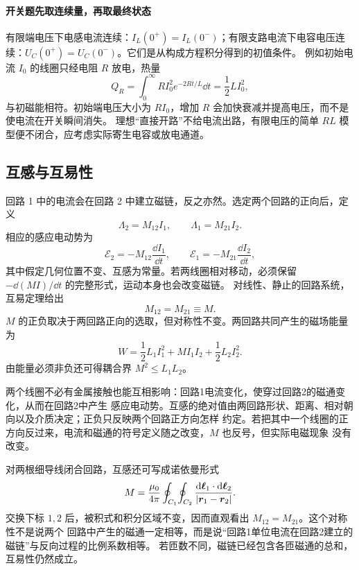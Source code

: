 {%
\paragraph{开关题先取连续量，再取最终状态}
有限端电压下电感电流连续：$I_L(0^+)=I_L(0^-)$；有限支路电流下电容电压连续：$U_C(0^+)=U_C(0^-)$。它们是从构成方程积分得到的初值条件。
例如初始电流 $I_0$ 的线圈只经电阻 $R$ 放电，热量
\[
 Q_R=\int_0^\infty RI_0^2e^{-2Rt/L}\dd t=\frac12LI_0^2,
\]
与初磁能相符。初始端电压大小为 $RI_0$，增加 $R$ 会加快衰减并提高电压，而不是使电流在开关瞬间消失。
理想“直接开路”不给电流出路，有限电压的简单 $RL$ 模型便不闭合，应考虑实际寄生电容或放电通道。


\subsection{互感与互易性}


回路 1 中的电流会在回路 2 中建立磁链，反之亦然。选定两个回路的正向后，定义
\begin{equation}
  \Lambda_2=M_{12}I_1,
  \qquad
  \Lambda_1=M_{21}I_2.
\end{equation}
相应的感应电动势为
\begin{equation}
  \mathcal E_2=-M_{12}\frac{\dd I_1}{\dd t},
  \qquad
  \mathcal E_1=-M_{21}\frac{\dd I_2}{\dd t},
\end{equation}
其中假定几何位置不变、互感为常量。若两线圈相对移动，必须保留
$-\dd(MI)/\dd t$ 的完整形式，运动本身也会改变磁链。
对线性、静止的回路系统，互易定理给出
\begin{equation}
  \boxed{M_{12}=M_{21}\equiv M}.
\end{equation}
$M$ 的正负取决于两回路正向的选取，但对称性不变。两回路共同产生的磁场能量为
\begin{equation}
  \boxed{W=\frac12L_1I_1^2+MI_1I_2+\frac12L_2I_2^2}.
\end{equation}
由能量必须非负还可得耦合界 $M^2\le L_1L_2$。

两个线圈不必有金属接触也能互相影响：回路1电流变化，使穿过回路2的磁通变化，从而在回路2中产生
感应电动势。互感的绝对值由两回路形状、距离、相对朝向以及介质决定；正负只反映两个回路正方向怎样
约定。若把其中一个线圈的正方向反过来，电流和磁通的符号定义随之改变，$M$ 也反号，但实际电磁现象
没有改变。

对两根细导线闭合回路，互感还可写成诺依曼形式
\begin{equation}
  M=\frac{\mu_0}{4\pi}\oint_{C_1}\!\oint_{C_2}
  \frac{\mathop{}\!\mathrm d\bm{\ell}_1\cdot\mathop{}\!\mathrm d\bm{\ell}_2}{|\bm{r}_1-\bm{r}_2|}.
\end{equation}
交换下标 $1,2$ 后，被积式和积分区域不变，因而直观看出 $M_{12}=M_{21}$。这个对称性不是说两个
回路中产生的磁通一定相等，而是说“回路1单位电流在回路2建立的磁链”与反向过程的比例系数相等。
若匝数不同，磁链已经包含各匝磁通的总和，互易性仍然成立。

}
